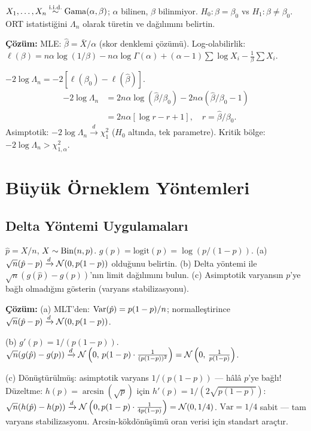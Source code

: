 \begin{ornek}
$X_1,\ldots,X_n\overset{\text{i.i.d.}}{\sim}\operatorname{Gama}(\alpha,\beta)$; $\alpha$ bilinen, $\beta$ bilinmiyor.
$H_0:\beta=\beta_0$ vs $H_1:\beta\neq\beta_0$.
ORT istatistiğini $\Lambda_n$ olarak türetin ve dağılımını belirtin.

\textbf{Çözüm:}
MLE: $\hat\beta=\bar X/\alpha$ (skor denklemi çözümü). Log-olabilirlik:
$\ell(\beta)=n\alpha\log(1/\beta)-n\alpha\log\Gamma(\alpha)+(\alpha-1)\sum\log X_i-\frac{1}{\beta}\sum X_i$.

$-2\log\Lambda_n = -2[\ell(\beta_0)-\ell(\hat\beta)]$.
\begin{align*}
  -2\log\Lambda_n &= 2n\alpha\log(\hat\beta/\beta_0)-2n\alpha(\hat\beta/\beta_0-1) \\
  &= 2n\alpha[\log r - r + 1], \quad r=\hat\beta/\beta_0.
\end{align*}
Asimptotik: $-2\log\Lambda_n\xrightarrow{d}\chi^2_1$ ($H_0$ altında, tek parametre). Kritik bölge: $-2\log\Lambda_n>\chi^2_{1,\alpha}$.
\end{ornek}

\section{Büyük Örneklem Yöntemleri}
\label{app:buyuk_orneklem}

\subsection{Delta Yöntemi Uygulamaları}

\begin{ornek}
$\hat p=X/n$, $X\sim\operatorname{Bin}(n,p)$. $g(p)=\mathrm{logit}(p)=\log(p/(1-p))$.
(a) $\sqrt{n}(\hat p-p)\xrightarrow{d}\mathcal{N}(0,p(1-p))$ olduğunu belirtin.
(b) Delta yöntemi ile $\sqrt{n}(g(\hat p)-g(p))$'nın limit dağılımını bulun.
(c) Asimptotik varyansın $p$'ye bağlı olmadığını gösterin (varyans stabilizasyonu).

\textbf{Çözüm:}
(a) MLT'den: $\operatorname{Var}(\hat p)=p(1-p)/n$; normalleştirince $\sqrt{n}(\hat p-p)\xrightarrow{d}\mathcal{N}(0,p(1-p))$.

(b) $g'(p)=1/(p(1-p))$.
$\sqrt{n}(g(\hat p)-g(p))\xrightarrow{d}\mathcal{N}\left(0,\,p(1-p)\cdot\frac{1}{(p(1-p))^2}\right)=\mathcal{N}\left(0,\,\frac{1}{p(1-p)}\right)$.

(c) Dönüştürülmüş: asimptotik varyans $1/(p(1-p))$ --- hâlâ $p$'ye bağlı!
Düzeltme: $h(p)=\arcsin(\sqrt{p})$ için $h'(p)=1/(2\sqrt{p(1-p)})$:
$\sqrt{n}(h(\hat p)-h(p))\xrightarrow{d}\mathcal{N}\left(0,p(1-p)\cdot\frac{1}{4p(1-p)}\right)=\mathcal{N}(0,1/4)$.
$\mathrm{Var}=1/4$ sabit --- tam varyans stabilizasyonu. Arcsin-kökdönüşümü oran verisi için standart araçtır.
\end{ornek}

